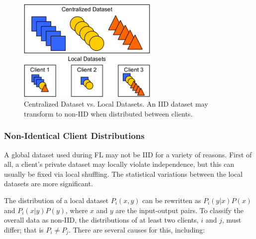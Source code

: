 \begin{figure}[H]
    \centering
        \includegraphics[width=0.6\textwidth]{Images/block_diagrams/data_distribution.png}
        \decoRule
        \caption[Data distribution]{Centralized Dataset vs. Local Datasets. An IID dataset may transform to non-IID when distributed between clients.}
        \label{fig:Data distribution}
\end{figure}

\subsubsection{Non-Identical Client Distributions}
A global dataset used during FL may not be IID for a variety of reasons. First of all, a client's private dataset may locally violate independence, but this can usually be fixed via local shuffling. The statistical variations between the local datasets are more significant.

The distribution of a local dataset \(P_i(x,y)\) can be rewritten as \(P_i(y|x)P(x)\) and \(P_i(x|y)P(y)\), where \(x\) and \(y\) are the input-output pairs. To classify the overall data as non-IID, the distributions of at least two clients, \(i\) and \(j\), must differ; that is \(P_i \neq P_j\). There are several causes for this, including:

